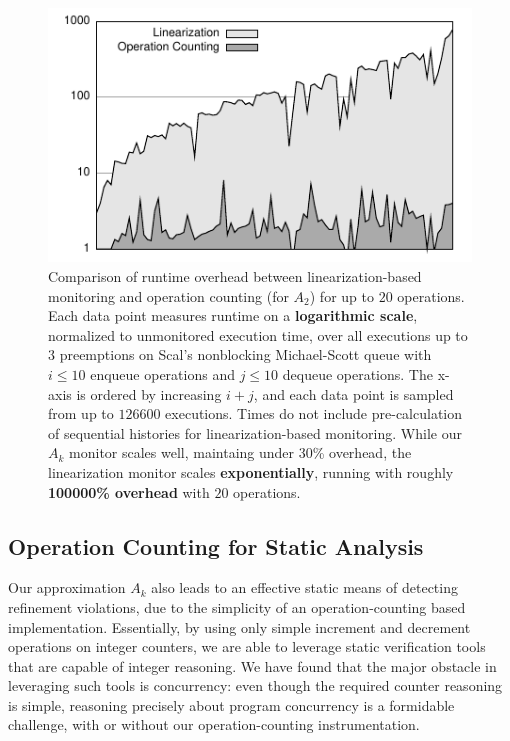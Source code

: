 \begin{figure}
  \centering
  \includegraphics[width=\linewidth]{figures/lin-vs-counting-time}
  \caption{Comparison of runtime overhead between linearization-based monitoring
    and operation counting (for $A_2$) for up to $20$ operations. Each data
    point measures runtime on a \textbf{logarithmic scale}, normalized to
    unmonitored execution time, over all executions up to $3$ preemptions on
    Scal's nonblocking Michael-Scott queue with $i\!\le\!10$ enqueue operations
    and $j\!\le\!10$ dequeue operations. The x-axis is ordered by increasing
    $i\!+\!j$, and each data point is sampled from up to $126600$ executions.
    Times do not include pre-calculation of sequential histories for
    linearization-based monitoring. While our $A_k$ monitor
    scales well, maintaing under 30\% overhead, the linearization monitor
    scales \textbf{exponentially}, running with roughly \textbf{100000\%
    overhead} with $20$ operations.
  }
  \label{fig:data:runtime}
\end{figure}

\subsection{Operation Counting for Static Analysis}
\label{sec:exp:static}

Our approximation $A_k$ also leads to an effective static means of detecting
refinement violations, due to the simplicity of an operation-counting based
implementation. Essentially, by using only simple increment and decrement
operations on integer counters, we are able to leverage static verification
tools that are capable of integer reasoning. We have found that the major
obstacle in leveraging such tools is concurrency: even though the required
counter reasoning is simple, reasoning precisely about program concurrency is a
formidable challenge, with or without our operation-counting instrumentation.

